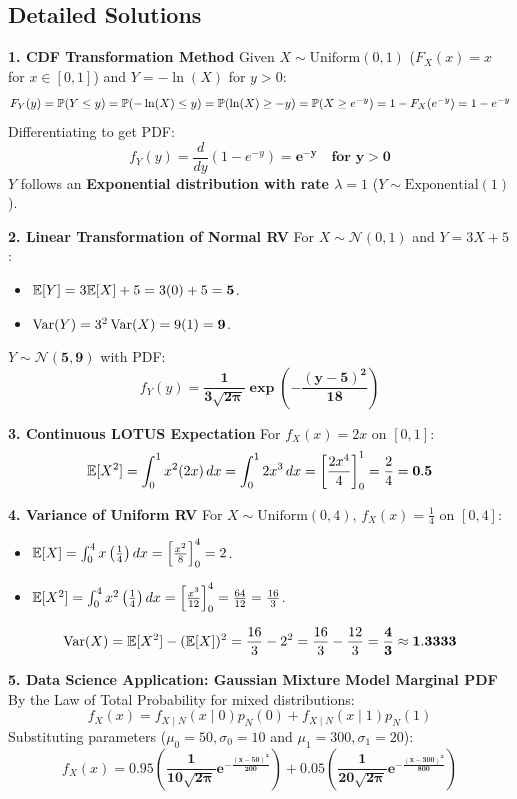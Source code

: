 \subsection*{Detailed Solutions}

\textbf{1. CDF Transformation Method}
Given $X \sim \text{Uniform}(0, 1)$ ($F_X(x) = x$ for $x \in [0, 1]$) and $Y = -\ln(X)$ for $y > 0$:
$$F_Y(y) = \P(Y \le y) = \P(-\ln(X) \le y) = \P(\ln(X) \ge -y) = \P(X \ge e^{-y}) = 1 - F_X(e^{-y}) = 1 - e^{-y}$$
Differentiating to get PDF:
$$f_Y(y) = \frac{d}{dy} (1 - e^{-y}) = \mathbf{e^{-y} \quad \text{for } y > 0}$$
$Y$ follows an \textbf{Exponential distribution with rate $\lambda = 1$} ($Y \sim \text{Exponential}(1)$).

\textbf{2. Linear Transformation of Normal RV}
For $X \sim \mathcal{N}(0, 1)$ and $Y = 3X + 5$:
\begin{itemize}
    \item $\E[Y] = 3\E[X] + 5 = 3(0) + 5 = \mathbf{5}$.
    \item $\Var(Y) = 3^2 \Var(X) = 9(1) = \mathbf{9}$.
\end{itemize}
$Y \sim \mathbf{\mathcal{N}(5, 9)}$ with PDF:
$$f_Y(y) = \mathbf{\frac{1}{3\sqrt{2\pi}} \exp\left( -\frac{(y - 5)^2}{18} \right)}$$

\textbf{3. Continuous LOTUS Expectation}
For $f_X(x) = 2x$ on $[0, 1]$:
$$\E[X^2] = \int_0^1 x^2 (2x) \, dx = \int_0^1 2x^3 \, dx = \left[ \frac{2x^4}{4} \right]_0^1 = \frac{2}{4} = \mathbf{0.5}$$

\textbf{4. Variance of Uniform RV}
For $X \sim \text{Uniform}(0, 4)$, $f_X(x) = \frac{1}{4}$ on $[0, 4]$:
\begin{itemize}
    \item $\E[X] = \int_0^4 x \left(\frac{1}{4}\right) dx = \left[\frac{x^2}{8}\right]_0^4 = 2$.
    \item $\E[X^2] = \int_0^4 x^2 \left(\frac{1}{4}\right) dx = \left[\frac{x^3}{12}\right]_0^4 = \frac{64}{12} = \frac{16}{3}$.
\end{itemize}
$$\Var(X) = \E[X^2] - (\E[X])^2 = \frac{16}{3} - 2^2 = \frac{16}{3} - \frac{12}{3} = \mathbf{\frac{4}{3} \approx 1.3333}$$

\textbf{5. Data Science Application: Gaussian Mixture Model Marginal PDF}
By the Law of Total Probability for mixed distributions:
$$f_X(x) = f_{X \mid N}(x \mid 0) p_N(0) + f_{X \mid N}(x \mid 1) p_N(1)$$
Substituting parameters ($\mu_0 = 50, \sigma_0 = 10$ and $\mu_1 = 300, \sigma_1 = 20$):
$$f_X(x) = \mathbf{0.95 \left( \frac{1}{10\sqrt{2\pi}} e^{-\frac{(x - 50)^2}{200}} \right) + 0.05 \left( \frac{1}{20\sqrt{2\pi}} e^{-\frac{(x - 300)^2}{800}} \right)}$$

